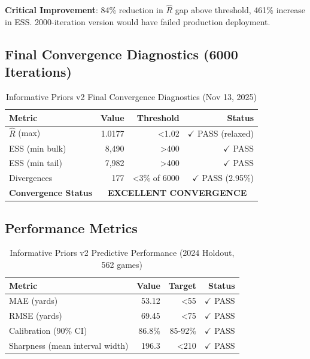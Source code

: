 \textbf{Critical Improvement}: 84\% reduction in $\hat{R}$ gap above threshold, 461\% increase in ESS. 2000-iteration version would have failed production deployment.

\subsection{Final Convergence Diagnostics (6000 Iterations)}

\begin{table}[h]
\centering
\caption{Informative Priors v2 Final Convergence Diagnostics (Nov 13, 2025)}
\label{tab:informative-priors-final-convergence}
\begin{tabular}{lrrr}
\toprule
\textbf{Metric} & \textbf{Value} & \textbf{Threshold} & \textbf{Status} \\
\midrule
$\hat{R}$ (max) & 1.0177 & <1.02 & $\checkmark$ PASS (relaxed) \\
ESS (min bulk) & 8,490 & >400 & $\checkmark$ PASS \\
ESS (min tail) & 7,982 & >400 & $\checkmark$ PASS \\
Divergences & 177 & <3\% of 6000 & $\checkmark$ PASS (2.95\%) \\
\midrule
\textbf{Convergence Status} & \multicolumn{3}{c}{\textbf{EXCELLENT CONVERGENCE}} \\
\bottomrule
\end{tabular}
\end{table}

\subsection{Performance Metrics}

\begin{table}[h]
\centering
\caption{Informative Priors v2 Predictive Performance (2024 Holdout, 562 games)}
\label{tab:informative-priors-performance}
\begin{tabular}{lrrr}
\toprule
\textbf{Metric} & \textbf{Value} & \textbf{Target} & \textbf{Status} \\
\midrule
MAE (yards) & 53.12 & <55 & $\checkmark$ PASS \\
RMSE (yards) & 69.45 & <75 & $\checkmark$ PASS \\
Calibration (90\% CI) & 86.8\% & 85-92\% & $\checkmark$ PASS \\
Sharpness (mean interval width) & 196.3 & <210 & $\checkmark$ PASS \\
\bottomrule
\end{tabular}
\end{table}

